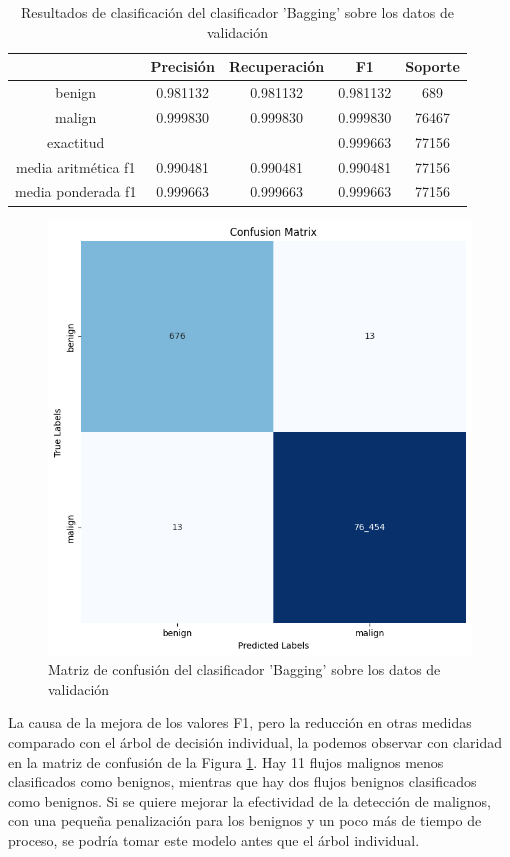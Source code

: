 \begin{table}[H]
    \begin{center}
        \begin{tabular}{|c | c c c | c |} 
            \hline
            & \textbf{Precisión} & \textbf{Recuperación} & \textbf{F1}  & \textbf{Soporte} \\
            \hline
            benign               & 0.981132 & 0.981132 & 0.981132  &   689 \\
            malign               & 0.999830 & 0.999830 & 0.999830  & 76467 \\
            \hline
            exactitud            &          &          & 0.999663  & 77156 \\
            media aritmética f1  & 0.990481 & 0.990481 & 0.990481  & 77156 \\
            media ponderada f1   & 0.999663 & 0.999663 & 0.999663  & 77156 \\
            \hline
        \end{tabular}
    \end{center}
    \caption{Resultados de clasificación del clasificador 'Bagging' sobre los datos de validación}
    \label{table:baggingresults}
\end{table}

\begin{figure}[H]
    \begin{center}
        \includegraphics[width=0.55\linewidth]{media/packet_pincer_train_models_bagging.png}
    \end{center}
    \caption{Matriz de confusión del clasificador 'Bagging' sobre los datos de validación}\label{fig:baggingmatrix}
\end{figure}

La causa de la mejora de los valores F1, pero la reducción en otras medidas comparado con el árbol de decisión individual, la podemos observar con claridad en la matriz de confusión de la Figura \ref{fig:baggingmatrix}. Hay 11 flujos malignos menos clasificados como benignos, mientras que hay dos flujos benignos clasificados como benignos. Si se quiere mejorar la efectividad de la detección de malignos, con una pequeña penalización para los benignos y un poco más de tiempo de proceso, se podría tomar este modelo antes que el árbol individual.

